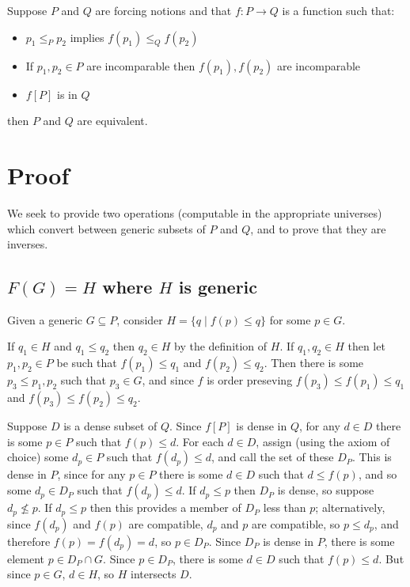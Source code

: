 \documentclass[12pt]{article}
\begin{document}
Suppose $P$ and $Q$ are forcing notions and that $f:P\rightarrow Q$ is a function such that:
\begin{itemize}

\item $p_1\leq_P p_2$ implies $f(p_1)\leq_Q f(p_2)$



\item If $p_1,p_2\in P$ are incomparable then $f(p_1),f(p_2)$ are incomparable

\item $f[P]$ is  in $Q$
\end{itemize}

then $P$ and $Q$ are equivalent.

\section*{Proof}

We seek to provide two operations (computable in the appropriate universes) which convert between generic subsets of $P$ and $Q$, and to prove that they are inverses.


\subsection*{$F(G)=H$ where $H$ is generic}
Given a generic $G\subseteq P$, consider $H=\{q\mid f(p)\leq q\}$ for some $p\in G$.

If $q_1\in H$ and $q_1\leq q_2$ then $q_2\in H$ by the definition of $H$.  If $q_1,q_2\in H$ then let $p_1,p_2\in P$ be such that $f(p_1)\leq q_1$ and $f(p_2)\leq q_2$.  Then there is some $p_3\leq p_1,p_2$ such that $p_3\in G$, and since $f$ is order preseving $f(p_3)\leq f(p_1)\leq q_1$ and $f(p_3)\leq f(p_2)\leq q_2$.

Suppose $D$ is a dense subset of $Q$.  Since $f[P]$ is dense in $Q$, for any $d\in D$ there is some $p\in P$ such that $f(p)\leq d$.  For each $d\in D$, assign (using the axiom of choice) some $d_p\in P$ such that $f(d_p)\leq d$, and call the set of these $D_P$.  This is dense in $P$, since for any $p\in P$ there is some $d\in D$ such that $d\leq f(p)$, and so some $d_p\in D_P$ such that $f(d_p)\leq d$.  If $d_p\leq p$ then $D_P$ is dense, so suppose $d_p\nleq p$.  If $d_p\leq p$ then this provides a member of $D_P$ less than $p$; alternatively, since $f(d_p)$ and $f(p)$ are compatible, $d_p$ and $p$ are compatible, so $p\leq d_p$, and therefore $f(p)=f(d_p)=d$, so $p\in D_P$.  Since $D_P$ is dense in $P$, there is some element $p\in D_P\cap G$.  Since $p\in D_P$, there is some $d\in D$ such that $f(p)\leq d$.  But since $p\in G$, $d\in H$, so $H$ intersects $D$.
\end{document}
